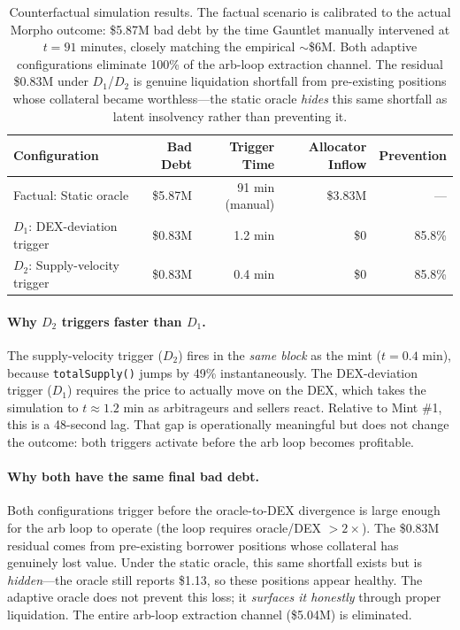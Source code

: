 \documentclass[11pt]{article}
\begin{document}
\begin{table}[H]
\centering
\begin{tabular}{lrrrr}
\toprule
Configuration & Bad Debt & Trigger Time & Allocator Inflow & Prevention \\
\midrule
Factual: Static oracle & \$5.87M & 91 min (manual) & \$3.83M & --- \\
$D_1$: DEX-deviation trigger & \$0.83M & 1.2 min & \$0 & 85.8\% \\
$D_2$: Supply-velocity trigger & \$0.83M & 0.4 min & \$0 & 85.8\% \\
\bottomrule
\end{tabular}
\caption{\label{tab:resolv_counterfactual}Counterfactual simulation results. The factual scenario is calibrated to the actual Morpho outcome: \$5.87M bad debt by the time Gauntlet manually intervened at $t=91$ minutes, closely matching the empirical $\sim$\$6M. Both adaptive configurations eliminate 100\% of the arb-loop extraction channel. The residual \$0.83M under $D_1$/$D_2$ is genuine liquidation shortfall from pre-existing positions whose collateral became worthless---the static oracle \emph{hides} this same shortfall as latent insolvency rather than preventing it.}
\end{table}

\paragraph{Why $D_2$ triggers faster than $D_1$.} The supply-velocity trigger ($D_2$) fires in the \emph{same block} as the mint ($t=0.4$ min), because \texttt{totalSupply()} jumps by 49\% instantaneously. The DEX-deviation trigger ($D_1$) requires the price to actually move on the DEX, which takes the simulation to $t\approx 1.2$ min as arbitrageurs and sellers react. Relative to Mint \#1, this is a 48-second lag. That gap is operationally meaningful but does not change the outcome: both triggers activate before the arb loop becomes profitable.

\paragraph{Why both have the same final bad debt.} Both configurations trigger before the oracle-to-DEX divergence is large enough for the arb loop to operate (the loop requires oracle/DEX $>2\times$). The \$0.83M residual comes from pre-existing borrower positions whose collateral has genuinely lost value. Under the static oracle, this same shortfall exists but is \emph{hidden}---the oracle still reports \$1.13, so these positions appear healthy. The adaptive oracle does not prevent this loss; it \emph{surfaces it honestly} through proper liquidation. The entire arb-loop extraction channel (\$5.04M) is eliminated.
\end{document}
